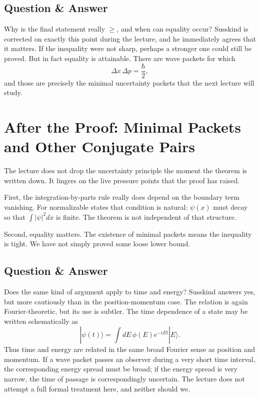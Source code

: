 \subsection{Question \& Answer}

Why is the final statement really \(\ge\), and when can equality occur? Susskind is corrected on exactly this point during the lecture, and he immediately agrees that it matters. If the inequality were not sharp, perhaps a stronger one could still be proved. But in fact equality is attainable. There are wave packets for which
\begin{equation}
\Delta x\,\Delta p=\frac{\hbar}{2},
\end{equation}
and those are precisely the minimal uncertainty packets that the next lecture will study.

\section{After the Proof: Minimal Packets and Other Conjugate Pairs}

The lecture does not drop the uncertainty principle the moment the theorem is written down. It lingers on the live pressure points that the proof has raised.

First, the integration-by-parts rule really does depend on the boundary term vanishing. For normalizable states that condition is natural: \(\psi(x)\) must decay so that \(\int |\psi|^2 dx\) is finite. The theorem is not independent of that structure.

Second, equality matters. The existence of minimal packets means the inequality is tight. We have not simply proved some loose lower bound.

\subsection{Question \& Answer}

Does the same kind of argument apply to time and energy? Susskind answers yes, but more cautiously than in the position-momentum case. The relation is again Fourier-theoretic, but its use is subtler. The time dependence of a state may be written schematically as
\begin{equation}
|\psi(t)\rangle=\int dE\,\phi(E)e^{-iEt}|E\rangle.
\end{equation}
Thus time and energy are related in the same broad Fourier sense as position and momentum. If a wave packet passes an observer during a very short time interval, the corresponding energy spread must be broad; if the energy spread is very narrow, the time of passage is correspondingly uncertain. The lecture does not attempt a full formal treatment here, and neither should we.

